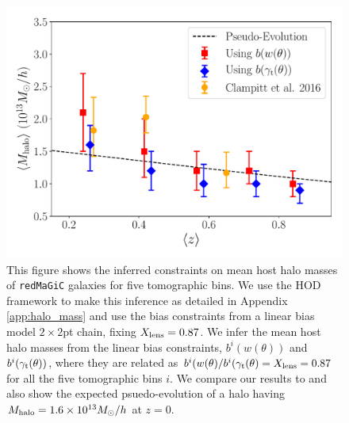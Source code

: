 \documentclass[aps, prd,twocolumn,superscriptaddress,nofootinbib,preprintnumbers]{revtex4-1}
\newcommand{\redmagic}{\texttt{redMaGiC} }
\newcommand{\SP}[1]{{\color{red}[SP: #1]}}
\newcommand{\blue}[1]{\textcolor{blue}{#1}}
\begin{document}
\begin{figure}
\includegraphics[width=\columnwidth]{figs/M_const.pdf}
\caption[]{
This figure shows the inferred constraints on mean host halo masses of \redmagic galaxies for five tomographic bins. We use the HOD framework to make this inference as detailed in Appendix \ref{app:halo_mass} and use the bias constraints from a linear bias model $2\times2$pt chain, fixing $X_{\rm lens} = 0.87$. We infer the mean host halo masses from the linear bias constraints, $b^{i}(w(\theta))$ and $b^{i}(\gamma_{\rm t}(\theta))$, where they are related as $b^{i}(w(\theta)/b^{i}(\gamma_{\rm t}(\theta) = X_{\rm lens} = 0.87$ for all the five tomographic bins $i$. We compare our results to \citet{Clampitt_2016} and also show the expected psuedo-evolution of a halo having $M_{\rm halo} = 1.6\times 10^{13} M_{\odot}/h$ at $z=0$. 
}
\label{fig:bias_mass_nbar}
\end{figure}
\end{document}
